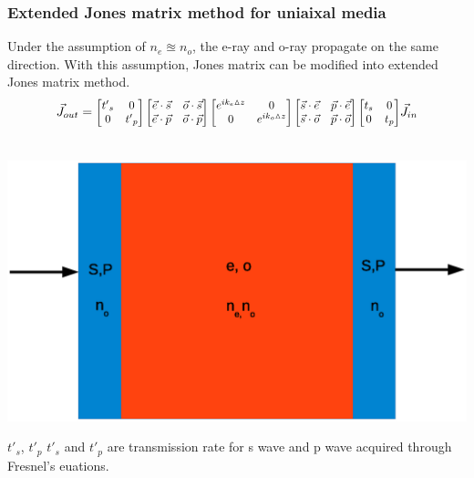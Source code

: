\documentclass{beamer}
\newcommand\scalemath[2]{\scalebox{#1}{\mbox{\ensuremath{\displaystyle #2}}}} %
\begin{document}
\begin{frame}
\frametitle{Extended Jones matrix method for uniaixal media}
Under the assumption of $n_e \approxeq n_o$, the e-ray and o-ray propagate on the same direction. With this assumption, Jones matrix can be modified into extended Jones matrix method.
\begin{eqnarray}
\vec{J}_{out} = 
\scalemath{0.9}{
\begin{bmatrix}
{t'}_s & 0 \\ 0 & {t'}_p
\end{bmatrix}
\begin{bmatrix}
\vec{e}\cdot\vec{s} & \vec{o}\cdot\vec{s} \\ \vec{e}\cdot\vec{p} & \vec{o}\cdot\vec{p}
\end{bmatrix}
\begin{bmatrix}
e^{ik_e\vartriangle z} & 0 \\ 0 & e^{ik_o\vartriangle z}
\end{bmatrix}
\begin{bmatrix}
\vec{s}\cdot\vec{e} & \vec{p}\cdot\vec{e} \\ \vec{s}\cdot\vec{o} & \vec{p}\cdot\vec{o}
\end{bmatrix}
\begin{bmatrix}
t_s & 0 \\ 0 & t_p
\end{bmatrix}
}
\vec{J}_{in} \\ \nonumber
\nonumber
\label{eq:extendedJones}
\end{eqnarray}
\begin{center}
\includegraphics[scale=0.25]{extj_uniaxial.eps}
\end{center}
${t'}_s$, ${t'}_p$ ${t'}_s$ and ${t'}_p$ are transmission rate for s wave and p wave acquired through Fresnel's euations.
\end{frame}
\end{document}
